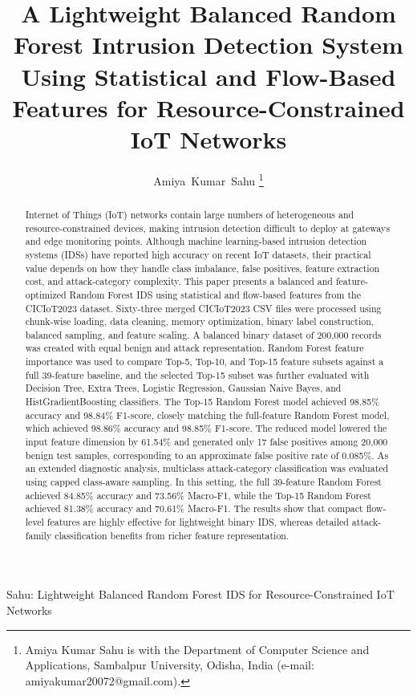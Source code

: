 \documentclass[journal]{IEEEtran}
\begin{document}
\title{A Lightweight Balanced Random Forest Intrusion Detection System Using Statistical and Flow-Based Features for Resource-Constrained IoT Networks}

\author{Amiya~Kumar~Sahu%
\thanks{Amiya Kumar Sahu is with the Department of Computer Science and Applications, Sambalpur University, Odisha, India (e-mail: amiyakumar20072@gmail.com).}%
}

%
{Sahu: Lightweight Balanced Random Forest IDS for Resource-Constrained IoT Networks}

\maketitle

\begin{abstract}
Internet of Things (IoT) networks contain large numbers of heterogeneous and resource-constrained devices, making intrusion detection difficult to deploy at gateways and edge monitoring points. Although machine learning-based intrusion detection systems (IDSs) have reported high accuracy on recent IoT datasets, their practical value depends on how they handle class imbalance, false positives, feature extraction cost, and attack-category complexity. This paper presents a balanced and feature-optimized Random Forest IDS using statistical and flow-based features from the CICIoT2023 dataset. Sixty-three merged CICIoT2023 CSV files were processed using chunk-wise loading, data cleaning, memory optimization, binary label construction, balanced sampling, and feature scaling. A balanced binary dataset of 200,000 records was created with equal benign and attack representation. Random Forest feature importance was used to compare Top-5, Top-10, and Top-15 feature subsets against a full 39-feature baseline, and the selected Top-15 subset was further evaluated with Decision Tree, Extra Trees, Logistic Regression, Gaussian Naive Bayes, and HistGradientBoosting classifiers. The Top-15 Random Forest model achieved 98.85\% accuracy and 98.84\% F1-score, closely matching the full-feature Random Forest model, which achieved 98.86\% accuracy and 98.85\% F1-score. The reduced model lowered the input feature dimension by 61.54\% and generated only 17 false positives among 20,000 benign test samples, corresponding to an approximate false positive rate of 0.085\%. As an extended diagnostic analysis, multiclass attack-category classification was evaluated using capped class-aware sampling. In this setting, the full 39-feature Random Forest achieved 84.85\% accuracy and 73.56\% Macro-F1, while the Top-15 Random Forest achieved 81.38\% accuracy and 70.61\% Macro-F1. The results show that compact flow-level features are highly effective for lightweight binary IDS, whereas detailed attack-family classification benefits from richer feature representation.
\end{abstract}
\end{document}
